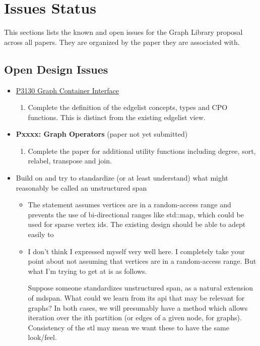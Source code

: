 \section{Issues Status}
This sections lists the known and open issues for the Graph Library proposal across all papers. They are organized
by the paper they are associated with.

\subsection{Open Design Issues}
\begin{itemize}
      \item \href{https://www.wg21.link/P3130}{P3130 Graph Container Interface}
            \begin{enumerate}
                  \item Complete the definition of the edgelist concepts, types and CPO functions. This is distinct from the existing edgelist view.
            \end{enumerate}
      \item \textbf{Pxxxx: Graph Operators} (paper not yet submitted)
            \begin{enumerate}
                  \item Complete the paper for additional utility functions including degree, sort, relabel, transpose and join.
            \end{enumerate}
      \item Build on  and try to standardize (or at least understand) what might reasonably be called an unstructured span
            \begin{itemize}
                  \item The statement assumes vertices are in a random-access range and prevents the use of bi-directional ranges like std::map, which 
                        could be used for sparse vertex ids. The existing design should be able to adept easily to 
                  \item I don't think I expressed myself very well here. I completely take your point about not assuming that vertices are in a random-access range. 
                        But what I'm trying to get at is as follows. 
                        
                        Suppose someone standardizes unstructured span, as a natural extension of mdspan. What could we 
                        learn from its api that may be relevant for graphs? In both cases, we will presumably have a method which allows iteration over the ith partition 
                        (or edges of a given node, for graphs). Consistency of the stl may mean we want these to have the same look/feel.
            \end{itemize}
\end{itemize}

